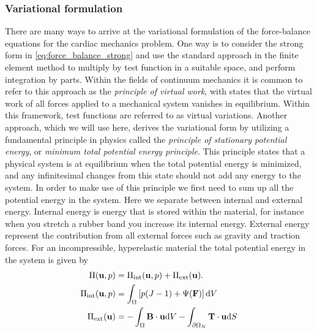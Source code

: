 \subsubsection{Variational formulation}
\label{sec:variational_formulation}
There are many ways to arrive at the variational formulation of the
force-balance equations for the cardiac mechanics problem.  One way is
to consider the strong form in \eqref{eq:force_balance_strong} and use
the standard approach in the finite element method to multiply by
test function in a suitable space, and perform integration by
parts. Within the fields of continuum mechanics it is common to
refer to this approach as the \emph{principle of virtual work}, with states
that the virtual work of all forces applied to a mechanical system
vanishes in equilibrium. Within this framework, test functions are
referred to as virtual variations.
Another approach, which we will use here, derives the variational form
by utilizing a fundamental principle in physics
called the \emph{principle of stationary potential energy}, or
\emph{minimum total potential energy principle}. This principle states that a
physical system is at equilibrium when the total potential energy is
minimized, and any infinitesimal changes from this state should not add
any energy to the system.
In order to make use of this principle we first need to sum up all the
potential energy in the system. Here we separate between internal and
external energy. Internal energy is energy that is stored within the
material, for instance when you stretch a rubber band you increase its
internal energy. External energy represent the contribution from all
external forces such as gravity and traction forces.
For an incompressible, hyperelastic material the total potential
energy in the system is given by
\begin{align}
  \Pi(\mathbf{u}, p) &= \Pi_{\mathrm{int}}(\mathbf{u},p) + \Pi_{\mathrm{ext}}(\mathbf{u}). \\
  \Pi_{\mathrm{int}}(\mathbf{u},p) &= \int_{\Omega} \left[ p(J - 1) +  \Psi(\mathbf{F}) \right] \mathrm{d}V\\
  \Pi_{\mathrm{ext}}(\mathbf{u}) &= - \int_{\Omega} \mathbf{B} \cdot \mathbf{u} \mathrm{d} V - \int_{\partial \Omega_N} \mathbf{T} \cdot \mathbf{u} \mathrm{d}S
\end{align}
